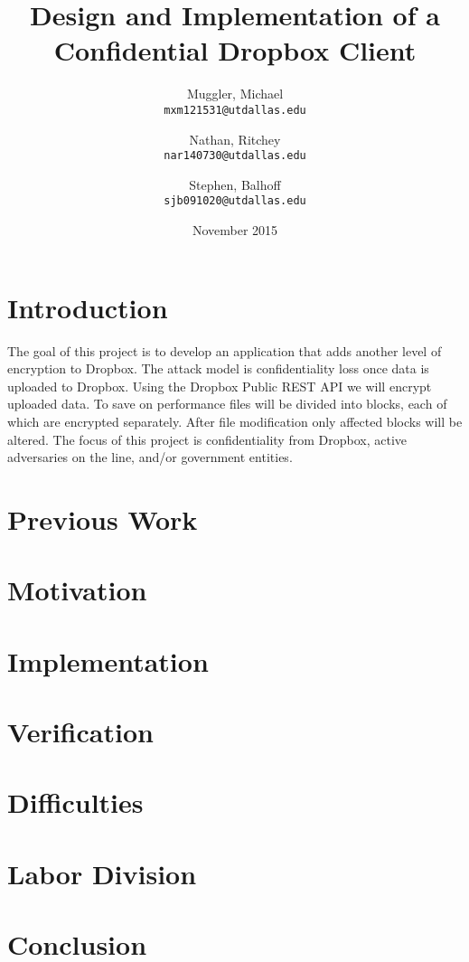 \documentclass[11pt]{article}
\title{Design and Implementation of a Confidential Dropbox Client}
\author{
  Muggler, Michael\\
  \texttt{mxm121531@utdallas.edu}
  \and
  Nathan, Ritchey\\
  \texttt{nar140730@utdallas.edu} 
  \and
  Stephen, Balhoff\\
  \texttt{sjb091020@utdallas.edu}
}
\date{November 2015}
\begin{document}
\maketitle

\section{Introduction}

The goal of this project is to develop an application that adds another level of encryption to Dropbox. The attack model is confidentiality loss once data is uploaded to Dropbox. Using the Dropbox Public REST API we will encrypt uploaded data. To save on performance files will be divided into blocks, each of which are encrypted separately. After file modification only affected blocks will be altered. The focus of this project is confidentiality from Dropbox, active adversaries on the line, and/or government entities.

\section{Previous Work}

\section{Motivation}

\section{Implementation}

\section{Verification}

\section{Difficulties}

\section{Labor Division}

\section{Conclusion}
\end{document}
